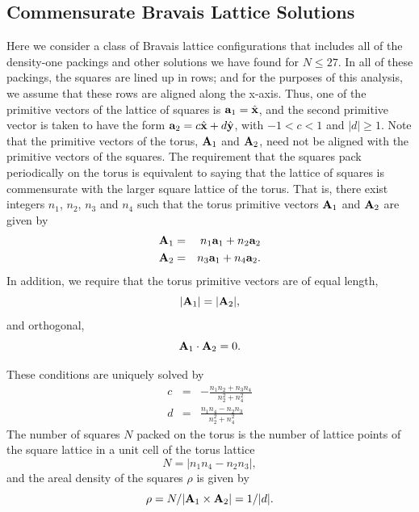 \documentclass[aps]{revtex4}
\newcommand{\ax}{{\bf a}_1}
\newcommand{\ay}{{\bf a}_2}
\newcommand{\Ax}{{\bf A}_1}
\newcommand{\Ay}{{\bf A}_2}
\begin{document}
\subsection{Commensurate Bravais Lattice Solutions}
Here we consider a class of Bravais lattice configurations that includes all of the density-one packings and other solutions we have found for  $N \leq 27$.   In all of these packings, the squares are lined up in rows; and for the purposes of this analysis, we assume that these rows are aligned along the x-axis. Thus, one of the primitive vectors of the lattice of squares is $\ax=\hat{{\bf x}}$, and the second primitive vector is taken to have the form $\ay=c \hat{{\bf x}} + d \hat{{\bf y}}$, with $-1< c <1$ and  $|d|\geq 1$.  Note that the primitive vectors of the torus, $\Ax$ and $\Ay$, need not be aligned with the primitive vectors of the squares.     The requirement that the squares pack periodically on the torus is equivalent to saying that the lattice of squares is commensurate with the larger square lattice of the torus.  That is, there exist  integers $n_1$, $n_2$, $n_3$ and $n_4$ such that the torus primitive vectors $\Ax$ and $\Ay$ are given by
\begin{eqnarray} 
\label{eqn:Ana}
\Ax&=& n_1 \ax + n_2 \ay \nonumber \\ 
\Ay&=&n_3 \ax + n_4 \ay.
\end{eqnarray}
In addition, we require that the torus primitive vectors are of equal length,
\begin{equation}
\label{eqn:normal}
|\Ax|=|\Ay| ,
\end{equation}
and orthogonal,
\begin{equation}
\label{eqn:ortho}
\Ax \cdot \Ay = 0 .
\end{equation}

These conditions are uniquely solved by
\begin{eqnarray}\label{eq:gap}
c &=& - \frac{n_1 n_2 + n_3 n_4}{n_2^2 + n_4^2}\\
d &=& \frac{n_1 n_4 - n_2 n_3}{n_2^2 + n_4^2} \nonumber
\end{eqnarray}
The number of squares $N$ packed on the torus is the number of lattice points of the square lattice in a unit cell of the torus lattice
\begin{equation}
\label{eqn:N}
N = |n_1 n_4 - n_2 n_3|,
\end{equation}
and the areal density of the squares $\rho$ is given by
\begin{equation}
\label{ }
\rho=N/|\Ax \times \Ay| = 1/|d|.
\end{equation}
\end{document}
